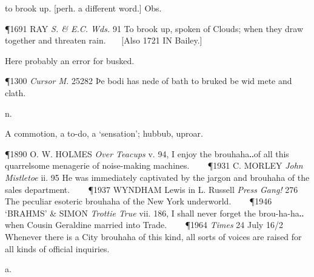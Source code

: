 \begin{description}[wide, labelwidth=!, labelindent=0pt]
\begin{myenumerate}
 to brook up. [perh. a different word.] Obs.

\P 1691 RAY  \textit{S. \& E.C. Wds.} 91 To brook up, spoken of Clouds; when they draw together and threaten rain.    [Also 1721 IN Bailey.]

\vspace{0.1cm} \noindent
Here probably an error for busked.

\P 1300 \textit{Cursor  M.} 25282 Þe bodi has nede of bath to bruked be wid mete and clath.
\end{myenumerate}


 n.

\noindent {}


\noindent
A commotion, a to-do, a ‘sensation’; hubbub, uproar.

\P 1890 O. W. HOLMES  \textit{Over Teacups} v. 94, I enjoy the brouhaha‥of all this quarrelsome menagerie of noise-making machines.    
\P 1931 C. MORLEY  \textit{John Mistletoe} ii. 95 He was immediately captivated by the jargon and brouhaha of the sales department.    
\P 1937 WYNDHAM  Lewis in L. Russell \textit{Press Gang!} 276 The peculiar esoteric brouhaha of the New York underworld.    
\P 1946 ‘BRAHMS’  \& SIMON \textit{Trottie True} vii. 186, I shall never forget the brou-ha-ha‥when Cousin Geraldine married into Trade.    
\P 1964  \textit{Times} 24 July 16/2 Whenever there is a City brouhaha of this kind, all sorts of voices are raised for all kinds of official inquiries.


 a.

\noindent {}

\vspace{-0.3cm}

\begin{myenumerate}


\end{myenumerate}
\end{description}
